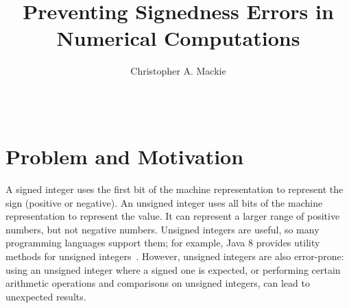 \documentclass{sig-alternate-05-2015}
\begin{document}
\setlength{\pdfpageheight}{\paperheight}
\setlength{\pdfpagewidth}{\paperwidth}

\title{Preventing Signedness Errors in Numerical Computations}

\author{
Christopher A. Mackie\\
       \\
       \\
}

\maketitle


\section{Problem and Motivation}

A signed integer uses the first bit of the machine representation to
represent the sign (positive or negative).  An unsigned integer uses all
bits of the machine representation to represent the value.  It can
represent a larger range of positive numbers, but not negative numbers.
Unsigned integers are useful, so many programming languages support them;
for example, Java 8 provides utility methods for unsigned
integers~\cite{JDK8UnsignedIntegerArithmetic2012}.  However, unsigned
integers are also error-prone:  using an unsigned integer where a signed
one is expected, or performing certain arithmetic operations and
comparisons on unsigned integers, can lead to unexpected results.
\end{document}
